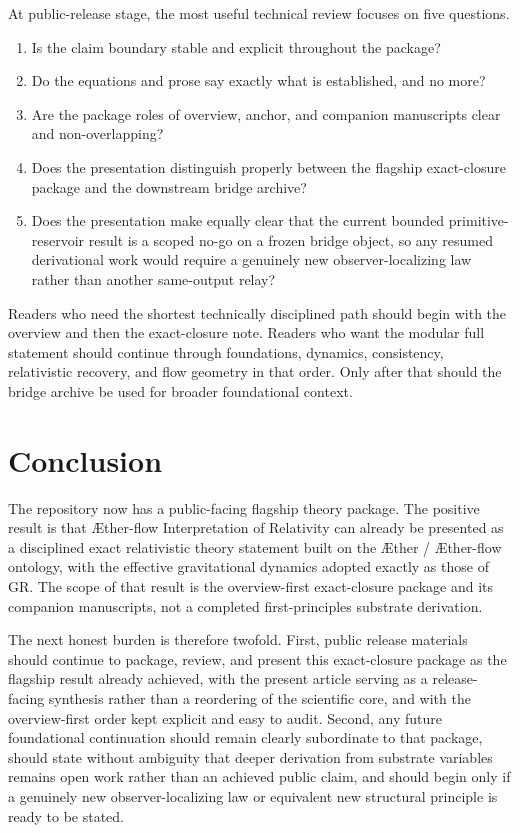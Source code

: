 \documentclass[11pt]{article}
\newcommand{\Aether}{\AE{}ther}
\newcommand{\Aflow}{\AE{}ther-flow}
\newcommand{\TheoryName}{\Aflow{} Interpretation of Relativity}
\begin{document}
At public-release stage, the most useful technical review focuses on five questions.
\begin{enumerate}
    \item Is the claim boundary stable and explicit throughout the package?
    \item Do the equations and prose say exactly what is established, and no more?
    \item Are the package roles of overview, anchor, and companion manuscripts clear and non-overlapping?
    \item Does the presentation distinguish properly between the flagship exact-closure package and the downstream bridge archive?
    \item Does the presentation make equally clear that the current bounded primitive-reservoir result is a scoped no-go on a frozen bridge object, so any resumed derivational work would require a genuinely new observer-localizing law rather than another same-output relay?
\end{enumerate}

Readers who need the shortest technically disciplined path should begin with the overview and then the exact-closure note. Readers who want the modular full statement should continue through foundations, dynamics, consistency, relativistic recovery, and flow geometry in that order. Only after that should the bridge archive be used for broader foundational context.

\section{Conclusion}

The repository now has a public-facing flagship theory package. The positive result is that \TheoryName{} can already be presented as a disciplined exact relativistic theory statement built on the \Aether{} / \Aflow{} ontology, with the effective gravitational dynamics adopted exactly as those of GR. The scope of that result is the overview-first exact-closure package and its companion manuscripts, not a completed first-principles substrate derivation.

The next honest burden is therefore twofold. First, public release materials should continue to package, review, and present this exact-closure package as the flagship result already achieved, with the present article serving as a release-facing synthesis rather than a reordering of the scientific core, and with the overview-first order kept explicit and easy to audit. Second, any future foundational continuation should remain clearly subordinate to that package, should state without ambiguity that deeper derivation from substrate variables remains open work rather than an achieved public claim, and should begin only if a genuinely new observer-localizing law or equivalent new structural principle is ready to be stated.


\end{document}
